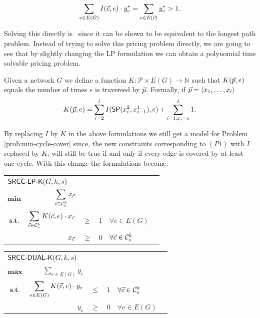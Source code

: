 $$
\sum_{e \in E(G)} I(\vec{c}, e) \cdot y^*_e = \sum_{e \in E(\vec{c})} y^*_e > 1.
$$

Solving this directly is \NPhard~since it can be shown to be equivalent to the longest path problem. 
Instead of trying to solve this pricing problem directly, we are going to see that by slightly changing the LP formulation we can
obtain a polynomial time solvable pricing problem.

\begin{definition}
Given a network $G$ we define a function $K : \mathcal{P} \times E(G) \rightarrow \mathbb{N}$ such that
$K(\vec{p}, e)$ equals the number of times $e$ is traversed by $\vec{p}$. Formally, if $\vec{p} = \langle x_1, \ldots, x_l \rangle$
$$
K(\vec{p}, e) = \sum_{i = 2}^l I(\mathsf{SP}(x^2_i, x^1_{i - 1}), e) + \sum_{i = 1 : x_i = e}^l 1.
$$
\end{definition}

By replacing $I$ by $K$ in the above formulations we still get a model for Problem \ref{prob:min-cycle-cover} since, the new constraints
corresponding to $(P1)$ with $I$ replaced by $K$, will still be true if and only if every edge is covered by at least one cycle. With this change the formulations become:

\begin{center}
\begin{tabular}{crcllr}
\multicolumn{5}{l}{$\textsf{SRCC-LP-K}(G, k, s)$} \\[0.5cm] 
$\mathbf{min}$ & $\displaystyle \sum_{\vec{c} \in \mathcal{C}^k_s} x_{\vec{c}}$ & & & & \\[0.5cm]
$\textbf{s.t.}$ & $\displaystyle \sum_{\vec{c} \in \mathcal{C}^k_s} K(\vec{c}, e) \cdot x_{\vec{c}}$   & $\geq$ & $1$ & $\forall e \in E(G)$ &  \\[0.5cm]
                & $x_{\vec{c}}$ & $\geq$  & $0$ & $\forall \vec{c} \in \mathcal{C}^k_s$
\end{tabular}
\end{center}

\begin{center}
\begin{tabular}{crcllr}
\multicolumn{5}{l}{$\textsf{SRCC-DUAL-K}(G, k, s)$} \\[0.5cm] 
$\mathbf{max}$ & $\displaystyle \sum_{e \in E(G)} y_{e}$ & & & & \\[0.5cm]
$\textbf{s.t.}$ & $\displaystyle \sum_{e \in E(G)} K(\vec{c}, e) \cdot y_e$   & $\leq$ & $1$ & $\forall \vec{c} \in \mathcal{C}^k_s$ &  \\[0.5cm]
                & $y_e$ & $\geq$ & $0$ & $\forall e \in E(G)$
\end{tabular}
\end{center}

